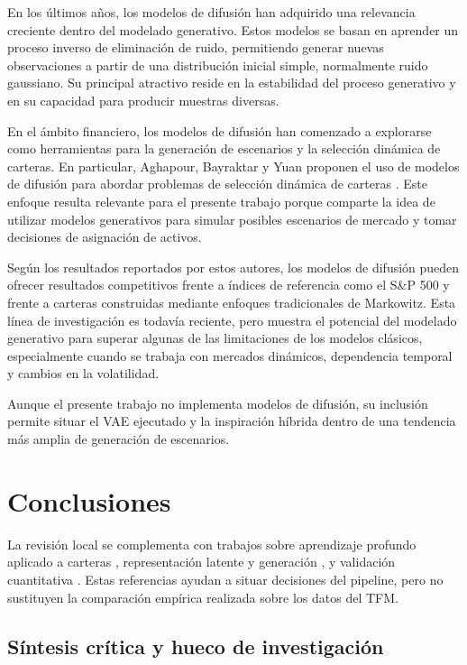 En los últimos años, los modelos de difusión han adquirido una relevancia creciente dentro del modelado generativo. Estos modelos se basan en aprender un proceso inverso de eliminación de ruido, permitiendo generar nuevas observaciones a partir de una distribución inicial simple, normalmente ruido gaussiano. Su principal atractivo reside en la estabilidad del proceso generativo y en su capacidad para producir muestras diversas.

En el ámbito financiero, los modelos de difusión han comenzado a explorarse como herramientas para la generación de escenarios y la selección dinámica de carteras. En particular, Aghapour, Bayraktar y Yuan proponen el uso de modelos de difusión para abordar problemas de selección dinámica de carteras \citeyear{aghapour2025solving}. Este enfoque resulta relevante para el presente trabajo porque comparte la idea de utilizar modelos generativos para simular posibles escenarios de mercado y tomar decisiones de asignación de activos.

Según los resultados reportados por estos autores, los modelos de difusión pueden ofrecer resultados competitivos frente a índices de referencia como el S\&P 500 y frente a carteras construidas mediante enfoques tradicionales de Markowitz. Esta línea de investigación es todavía reciente, pero muestra el potencial del modelado generativo para superar algunas de las limitaciones de los modelos clásicos, especialmente cuando se trabaja con mercados dinámicos, dependencia temporal y cambios en la volatilidad.

Aunque el presente trabajo no implementa modelos de difusión, su inclusión permite situar el VAE ejecutado y la inspiración híbrida dentro de una tendencia más amplia de generación de escenarios.

\section{Conclusiones}

La revisión local se complementa con trabajos sobre aprendizaje profundo aplicado a carteras \cite{jiang2017deep,huang2020deep,zhang2020deep}, representación latente y generación \cite{opitz2017latent,voronina2025genai}, y validación cuantitativa \cite{lopez2018advances,rasekhschaffe2026}. Estas referencias ayudan a situar decisiones del pipeline, pero no sustituyen la comparación empírica realizada sobre los datos del TFM.

\subsection{Síntesis crítica y hueco de investigación}

